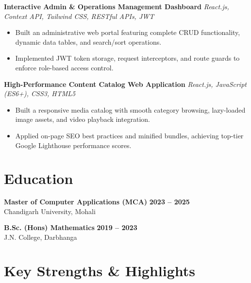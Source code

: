 \documentclass[a4paper,10pt]{article}
\begin{document}
\textbf{Interactive Admin \& Operations Management Dashboard}
\hfill
\textit{React.js, Context API, Tailwind CSS, RESTful APIs, JWT}

\begin{itemize}

    \item Built an administrative web portal featuring complete CRUD functionality, dynamic data tables, and search/sort operations.

    \item Implemented JWT token storage, request interceptors, and route guards to enforce role-based access control.

\end{itemize}


\textbf{High-Performance Content Catalog Web Application}
\hfill
\textit{React.js, JavaScript (ES6+), CSS3, HTML5}

\begin{itemize}

    \item Built a responsive media catalog with smooth category browsing, lazy-loaded image assets, and video playback integration.

    \item Applied on-page SEO best practices and minified bundles, achieving top-tier Google Lighthouse performance scores.

\end{itemize}

\section*{Education}

\textbf{Master of Computer Applications (MCA)}
\hfill
\textbf{2023 -- 2025}
\\
Chandigarh University, Mohali

\vspace{3pt}

\textbf{B.Sc. (Hons) Mathematics}
\hfill
\textbf{2019 -- 2023}
\\
J.N. College, Darbhanga

\section*{Key Strengths \& Highlights}
\end{document}
